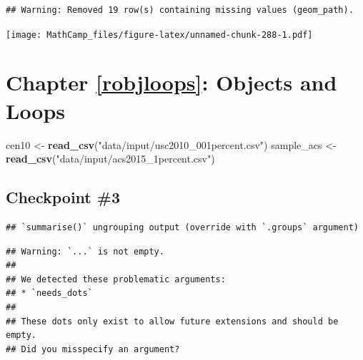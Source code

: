 \documentclass[
]{book}
\newenvironment{Shaded}{\begin{snugshade}}{\end{snugshade}}
\newcommand{\DataTypeTok}[1]{\textcolor[rgb]{0.13,0.29,0.53}{#1}}
\newcommand{\DecValTok}[1]{\textcolor[rgb]{0.00,0.00,0.81}{#1}}
\newcommand{\KeywordTok}[1]{\textcolor[rgb]{0.13,0.29,0.53}{\textbf{#1}}}
\newcommand{\NormalTok}[1]{#1}
\newcommand{\OperatorTok}[1]{\textcolor[rgb]{0.81,0.36,0.00}{\textbf{#1}}}
\newcommand{\StringTok}[1]{\textcolor[rgb]{0.31,0.60,0.02}{#1}}
\theoremstyle{definition}
\theoremstyle{definition}
\theoremstyle{definition}
\theoremstyle{definition}
\theoremstyle{remark}
\begin{document}
\begin{verbatim}
## Warning: Removed 19 row(s) containing missing values (geom_path).
\end{verbatim}

\texttt{[image: MathCamp\_files/figure-latex/unnamed-chunk-288-1.pdf]}

\hypertarget{chapter-refrobjloops-objects-and-loops}{%
\section{Chapter \ref{robjloops}: Objects and Loops}\label{chapter-refrobjloops-objects-and-loops}}

\begin{Shaded}
\begin{Highlighting}[]
\NormalTok{cen10 <-}\StringTok{ }\KeywordTok{read_csv}\NormalTok{(}\StringTok{"data/input/usc2010_001percent.csv"}\NormalTok{)}
\NormalTok{sample_acs <-}\StringTok{ }\KeywordTok{read_csv}\NormalTok{(}\StringTok{"data/input/acs2015_1percent.csv"}\NormalTok{)}
\end{Highlighting}
\end{Shaded}

\hypertarget{checkpoint-3}{%
\subsection*{Checkpoint \#3}\label{checkpoint-3}}

\begin{Shaded}
\end{Shaded}

\begin{verbatim}
## `summarise()` ungrouping output (override with `.groups` argument)
\end{verbatim}

\begin{verbatim}
## Warning: `...` is not empty.
## 
## We detected these problematic arguments:
## * `needs_dots`
## 
## These dots only exist to allow future extensions and should be empty.
## Did you misspecify an argument?
\end{verbatim}
\end{document}
